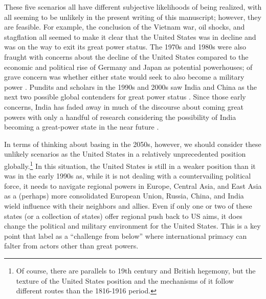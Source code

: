 These five scenarios all have different subjective likelihoods of being realized, with all seeming to be unlikely in the present writing of this manuscript; however, they are feasible. For example, the conclusion of the Vietnam war, oil shocks, and stagflation all seemed to make it clear that the United States was in decline and was on the way to exit its great power status. The 1970s and 1980s were also fraught with concerns about the decline of the United States compared to the economic and political rise of Germany and Japan as potential powerhouses; of grave concern was whether either state would seek to also become a military power \cite{maull1989}. Pundits and scholars in the 1990s and 2000s saw India and China as the next two possible global contenders for great power status \cite{gupta2006}. Since those early concerns, India has faded away in much of the discourse about coming great powers with only a handful of research considering the possibility of India becoming a great-power state in the near future \cite{pant2007,carranza2017,narlikar2019}. %

In terms of thinking about basing in the 2050s, however, we should consider these unlikely scenarios as the United States in a relatively unprecedented position globally.\footnote{Of course, there are parallels to 19th century and British hegemony, but the texture of the United States position and the mechanisms of it follow different routes than the 1816-1916 period.} In this situation, the United States is still in a weaker position than it was in the early 1990s as, while it is not dealing with a countervailing political force, it needs to navigate regional powers in Europe, Central Asia, and East Asia as a (perhaps) more consolidated European Union, Russia, China, and India wield influence with their neighbors and allies. Even if only one or two of these states (or a collection of states) offer regional push back to US aims, it does change the political and military environment for the United States. This is a key point that  label as a ``challenge from below'' where international primacy can falter from actors other than great powers.

